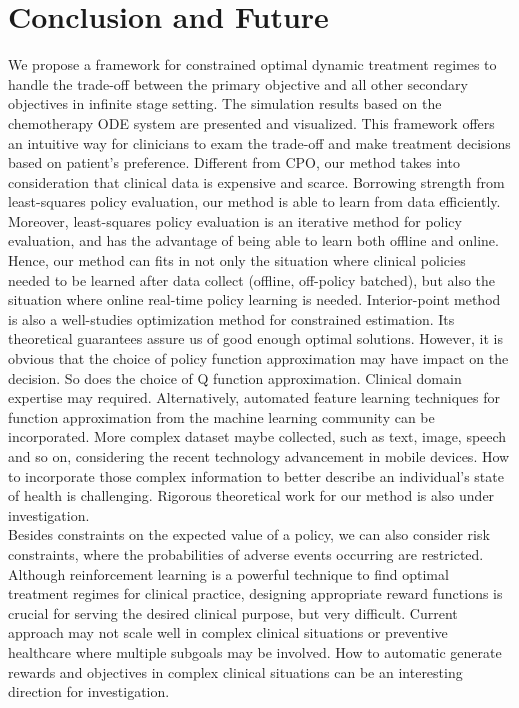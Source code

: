 \section{Conclusion and Future}
We propose a framework for constrained optimal dynamic treatment regimes to handle the trade-off between the primary objective and all other secondary objectives in infinite stage setting. The simulation results based on the chemotherapy ODE system are presented and visualized. This framework offers an intuitive way for clinicians to exam the trade-off and make treatment decisions based on patient's preference. Different from CPO, our method takes into consideration that clinical data is expensive and scarce. Borrowing strength from least-squares policy evaluation, our method is able to learn from data efficiently. Moreover, least-squares policy evaluation is an iterative method for policy evaluation, and has the advantage of being able to learn both offline and online. Hence, our method can fits in not only the situation where clinical policies needed to be learned after data collect (offline, off-policy batched), but also the situation where online real-time policy learning is needed. Interior-point method is also a well-studies optimization method for constrained estimation. Its theoretical guarantees assure us of good enough optimal solutions. However, it is obvious that the choice of policy function approximation may have impact on the decision. So does the choice of Q function approximation. Clinical domain expertise may required. Alternatively, automated feature learning techniques for function approximation from the machine learning community can be incorporated. More complex dataset maybe collected, such as text, image, speech and so on, considering the recent technology advancement in mobile devices. How to incorporate those complex information to better describe an individual's state of health is challenging. Rigorous theoretical work for our method is also under investigation.\\

Besides constraints on the expected value of a policy, we can also consider risk constraints, where the probabilities of adverse events occurring are restricted. Although reinforcement learning is a powerful technique to find optimal treatment regimes for clinical practice, designing appropriate reward functions is crucial for serving the desired clinical purpose, but very difficult. Current approach may not scale well in complex clinical situations or preventive healthcare where multiple subgoals may be involved. How to automatic generate rewards and objectives in complex clinical situations can be an interesting direction for investigation.\\

